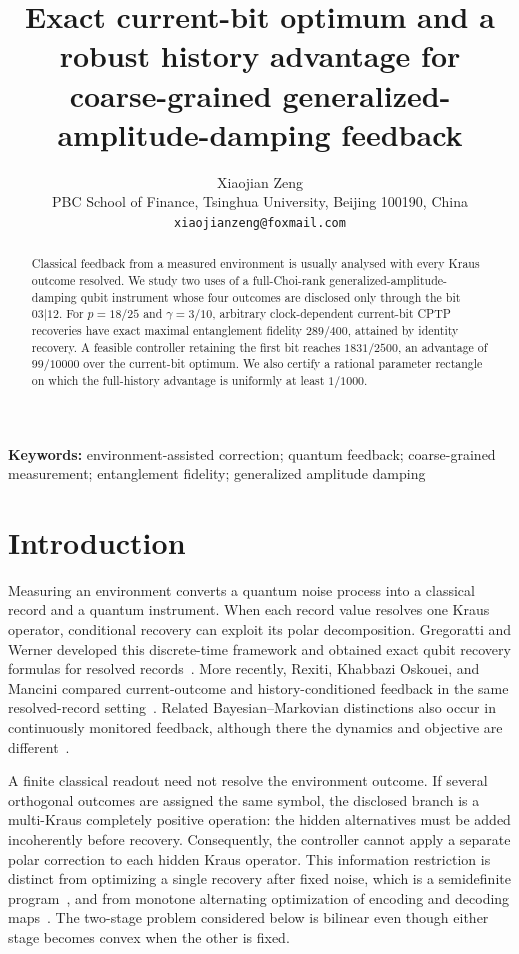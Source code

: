 \documentclass[11pt]{article}
\title{Exact current-bit optimum and a robust history advantage for\\
coarse-grained generalized-amplitude-damping feedback}
\author{Xiaojian Zeng\\
\small PBC School of Finance, Tsinghua University, Beijing 100190, China\\
\small \texttt{xiaojianzeng@foxmail.com}}
\date{}
\begin{document}
\maketitle

\begin{abstract}
Classical feedback from a measured environment is usually analysed with every Kraus
outcome resolved. We study two uses of a full-Choi-rank generalized-amplitude-damping
qubit instrument whose four outcomes are disclosed only through the bit $03|12$.
For $p=18/25$ and $\gamma=3/10$, arbitrary clock-dependent current-bit CPTP
recoveries have exact maximal entanglement fidelity $289/400$, attained by identity
recovery. A feasible controller retaining the first bit reaches $1831/2500$, an
advantage of $99/10000$ over the current-bit optimum. We also certify a rational
parameter rectangle on which the full-history advantage is uniformly at least
$1/1000$.
\end{abstract}

\noindent\textbf{Keywords:} environment-assisted correction; quantum feedback;
coarse-grained measurement; entanglement fidelity; generalized amplitude damping

\section{Introduction}

Measuring an environment converts a quantum noise process into a classical record
and a quantum instrument. When each record value resolves one Kraus operator,
conditional recovery can exploit its polar decomposition. Gregoratti and Werner
developed this discrete-time framework and obtained exact qubit recovery formulas for
resolved records~\cite{GregorattiWerner2004}. More recently, Rexiti, Khabbazi Oskouei,
and Mancini compared current-outcome and history-conditioned feedback in the same
resolved-record setting~\cite{RexitiEtAl2024}. Related Bayesian--Markovian distinctions
also occur in continuously monitored feedback, although there the dynamics and
objective are different~\cite{WisemanEtAl2002}.

A finite classical readout need not resolve the environment outcome. If several
orthogonal outcomes are assigned the same symbol, the disclosed branch is a
multi-Kraus completely positive operation: the hidden alternatives must be added
incoherently before recovery. Consequently, the controller cannot apply a separate
polar correction to each hidden Kraus operator. This information restriction is
distinct from optimizing a single recovery after fixed noise, which is a semidefinite
program~\cite{FletcherShorWin2007}, and from monotone alternating optimization of
encoding and decoding maps~\cite{ReimpellWerner2005}. The two-stage problem considered
below is bilinear even though either stage becomes convex when the other is fixed.
\end{document}
